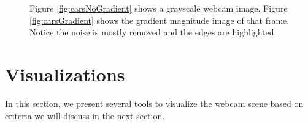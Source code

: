 \begin{figure}[ht]
	\centering
		\caption[Focusing on object edges with gradient magnitude images.]{Figure \ref{fig:carsNoGradient} shows a grayscale webcam image. Figure \ref{fig:carsGradient} shows the gradient magnitude image of that frame.  Notice the noise is mostly removed and the edges are highlighted.}
\end{figure}

\section{Visualizations}

In this section, we present several tools to visualize the webcam scene based on criteria we will discuss in the next section.

